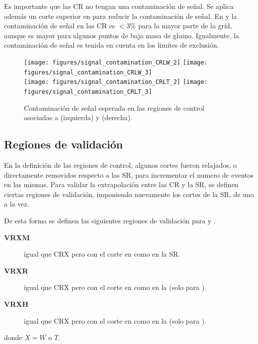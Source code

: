 
Es importante que las CR no tengan una contaminación de señal. Se aplica además
un corte superior en {\met} para reducir la contaminación de señal. En {\CRW} y
{\CRT} la contaminación de señal en las CR es $<3\%$ para la mayor parte de la
grid, aunque es mayor para algunos puntos de baja masa de gluino. Igualmente, la
contaminación de señal es tenida en cuenta en los limites de exclusión.


\begin{figure}[!htbp]
  \centering
  \texttt{[image: figures/signal\_contamination\_CRLW\_2]}
  \texttt{[image: figures/signal\_contamination\_CRLW\_3]} \\
  \texttt{[image: figures/signal\_contamination\_CRLT\_2]}
  \texttt{[image: figures/signal\_contamination\_CRLT\_3]} \\

  \caption{Contaminación de señal esperada en las regiones de control asociadas a {\SRL} (izquierda) y {\SRH} (derecha).}
  \label{fig:bkg_cr_contamination}
\end{figure}

\subsection{Regiones de validación}

En la definición de las regiones de control, algunos cortes fueron relajados, o directamente removidos
respecto a las SR, para incrementar el numero de eventos en las mismas. Para validar la extrapolación
entre las CR y la SR, se definen ciertas regiones de validación, imponiendo nuevamente los cortes de la SR, de
uno a la vez.

De esta forma se definen las siguientes regiones de validación para {\CRW} y {\CRT}.

\begin{description}
\item[\textbf{VRXM}] igual que CRX pero con el corte en {\met} como en la SR.
\item[\textbf{VRXR}]  igual que CRX pero con el corte en {\rt} como en la {\SRL} (solo para {\SRL}).
\item[\textbf{VRXH}]  igual que CRX pero con el corte en {\HT} como en la {\SRH} (solo para {\SRH}).
\end{description}
%
donde $X = W$ o $T$.

